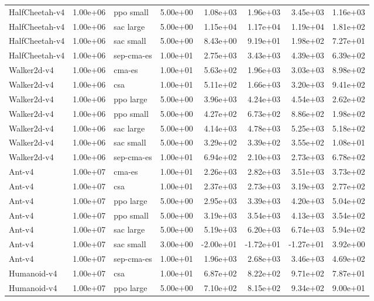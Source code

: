 \begin{longtable}{lrlrrrrr}
HalfCheetah-v4 & 1.00e+06 & ppo small & 5.00e+00 & 1.08e+03 & 1.96e+03 & 3.45e+03 & 1.16e+03 \\
HalfCheetah-v4 & 1.00e+06 & sac large & 5.00e+00 & 1.15e+04 & 1.17e+04 & 1.19e+04 & 1.81e+02 \\
HalfCheetah-v4 & 1.00e+06 & sac small & 5.00e+00 & 8.43e+00 & 9.19e+01 & 1.98e+02 & 7.27e+01 \\
HalfCheetah-v4 & 1.00e+06 & sep-cma-es & 1.00e+01 & 2.75e+03 & 3.43e+03 & 4.39e+03 & 6.39e+02 \\
Walker2d-v4 & 1.00e+06 & cma-es & 1.00e+01 & 5.63e+02 & 1.96e+03 & 3.03e+03 & 8.98e+02 \\
Walker2d-v4 & 1.00e+06 & csa & 1.00e+01 & 5.11e+02 & 1.66e+03 & 3.20e+03 & 9.41e+02 \\
Walker2d-v4 & 1.00e+06 & ppo large & 5.00e+00 & 3.96e+03 & 4.24e+03 & 4.54e+03 & 2.62e+02 \\
Walker2d-v4 & 1.00e+06 & ppo small & 5.00e+00 & 4.27e+02 & 6.73e+02 & 8.86e+02 & 1.98e+02 \\
Walker2d-v4 & 1.00e+06 & sac large & 5.00e+00 & 4.14e+03 & 4.78e+03 & 5.25e+03 & 5.18e+02 \\
Walker2d-v4 & 1.00e+06 & sac small & 5.00e+00 & 3.29e+02 & 3.39e+02 & 3.55e+02 & 1.08e+01 \\
Walker2d-v4 & 1.00e+06 & sep-cma-es & 1.00e+01 & 6.94e+02 & 2.10e+03 & 2.73e+03 & 6.78e+02 \\
Ant-v4 & 1.00e+07 & cma-es & 1.00e+01 & 2.26e+03 & 2.82e+03 & 3.51e+03 & 3.73e+02 \\
Ant-v4 & 1.00e+07 & csa & 1.00e+01 & 2.37e+03 & 2.73e+03 & 3.19e+03 & 2.77e+02 \\
Ant-v4 & 1.00e+07 & ppo large & 5.00e+00 & 2.95e+03 & 3.39e+03 & 4.20e+03 & 5.04e+02 \\
Ant-v4 & 1.00e+07 & ppo small & 5.00e+00 & 3.19e+03 & 3.54e+03 & 4.13e+03 & 3.54e+02 \\
Ant-v4 & 1.00e+07 & sac large & 5.00e+00 & 5.19e+03 & 6.20e+03 & 6.74e+03 & 5.94e+02 \\
Ant-v4 & 1.00e+07 & sac small & 3.00e+00 & -2.00e+01 & -1.72e+01 & -1.27e+01 & 3.92e+00 \\
Ant-v4 & 1.00e+07 & sep-cma-es & 1.00e+01 & 1.96e+03 & 2.68e+03 & 3.46e+03 & 4.69e+02 \\
Humanoid-v4 & 1.00e+07 & csa & 1.00e+01 & 6.87e+02 & 8.22e+02 & 9.71e+02 & 7.87e+01 \\
Humanoid-v4 & 1.00e+07 & ppo large & 5.00e+00 & 7.10e+02 & 8.15e+02 & 9.34e+02 & 9.00e+01 \\

\end{longtable}
